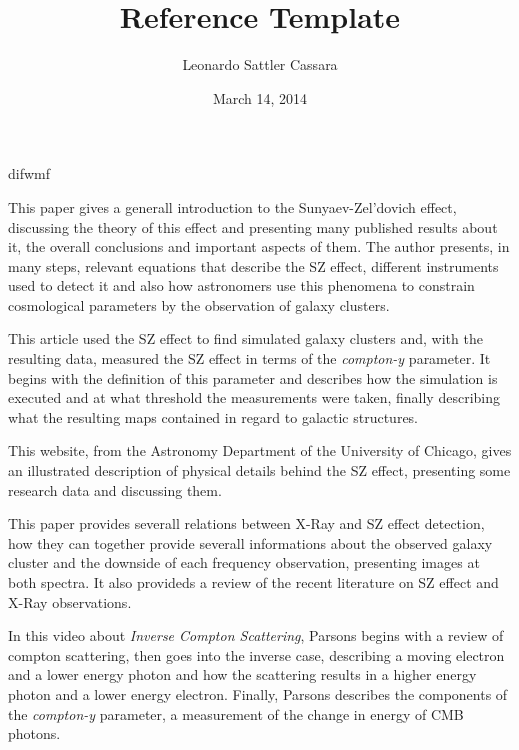 \documentclass{article}
\begin{document}
\title{Reference Template}


\author{Leonardo Sattler Cassara }
\date{March 14, 2014}

\maketitle

difwmf



{}

\cite{Birkinshaw} 

This paper gives a generall introduction to the Sunyaev-Zel'dovich
effect, discussing the theory of this effect and presenting many
published results about it, the overall conclusions and important
aspects of them. The author presents, in many steps, relevant equations that
describe the SZ effect, different instruments used to detect it and also
how astronomers use this phenomena to constrain cosmological parameters by
the observation of galaxy clusters.


\cite{Silva}

This article used the SZ effect to find simulated galaxy
clusters and, with the resulting data, measured the SZ effect in terms
of the \emph{compton-y} parameter. It begins with the definition of this
parameter and describes how the simulation is executed 
and at what threshold the measurements were
taken, finally describing what the resulting maps contained in regard
to galactic structures.  

\cite{Chicago}

This website, from the Astronomy Department of the University of
Chicago, gives an illustrated description of physical details behind
the SZ effect, presenting some research data and discussing them.  

\cite{Giodini}

This paper provides severall relations between X-Ray and
SZ effect detection, how they can together provide severall
informations about the observed galaxy cluster and the downside of each
frequency observation, presenting images at both spectra. It also
provideds a review of the recent literature on SZ effect and X-Ray observations.

\cite{Parsons}

In this video about \emph{Inverse Compton Scattering}, Parsons begins with a
review of compton scattering, then goes into the inverse case,
describing a moving electron and a lower energy photon and how the
scattering results in a higher energy photon and a lower energy
electron. Finally, Parsons describes the components of the \emph{compton-y}
parameter, a measurement of the change in energy of CMB photons.  
\end{document}
